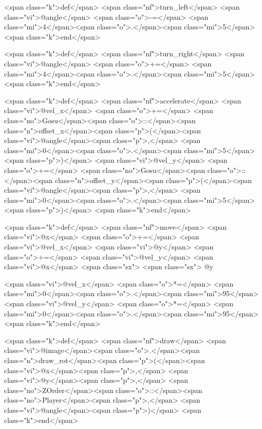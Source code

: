 \begin{rawhtml}
  <span class="k">def</span> <span class="nf">turn_left</span>
    <span class="vi">@angle</span> <span class="o">-=</span> <span class="mi">4</span><span class="o">.</span><span class="mi">5</span>
  <span class="k">end</span>
  
  <span class="k">def</span> <span class="nf">turn_right</span>
    <span class="vi">@angle</span> <span class="o">+=</span> <span class="mi">4</span><span class="o">.</span><span class="mi">5</span>
  <span class="k">end</span>
  
  <span class="k">def</span> <span class="nf">accelerate</span>
    <span class="vi">@vel_x</span> <span class="o">+=</span> <span class="no">Gosu</span><span class="o">::</span><span class="n">offset_x</span><span class="p">(</span><span class="vi">@angle</span><span class="p">,</span> <span class="mi">0</span><span class="o">.</span><span class="mi">5</span><span class="p">)</span>
    <span class="vi">@vel_y</span> <span class="o">+=</span> <span class="no">Gosu</span><span class="o">::</span><span class="n">offset_y</span><span class="p">(</span><span class="vi">@angle</span><span class="p">,</span> <span class="mi">0</span><span class="o">.</span><span class="mi">5</span><span class="p">)</span>
  <span class="k">end</span>
  
  <span class="k">def</span> <span class="nf">move</span>
    <span class="vi">@x</span> <span class="o">+=</span> <span class="vi">@vel_x</span>
    <span class="vi">@y</span> <span class="o">+=</span> <span class="vi">@vel_y</span>
    <span class="vi">@x</span> <span class="sx">%
<span class="sx">    @y %
    
    <span class="vi">@vel_x</span> <span class="o">*=</span> <span class="mi">0</span><span class="o">.</span><span class="mi">95</span>
    <span class="vi">@vel_y</span> <span class="o">*=</span> <span class="mi">0</span><span class="o">.</span><span class="mi">95</span>
  <span class="k">end</span>

  <span class="k">def</span> <span class="nf">draw</span>
    <span class="vi">@image</span><span class="o">.</span><span class="n">draw_rot</span><span class="p">(</span><span class="vi">@x</span><span class="p">,</span> <span class="vi">@y</span><span class="p">,</span> <span class="no">ZOrder</span><span class="o">::</span><span class="no">Player</span><span class="p">,</span> <span class="vi">@angle</span><span class="p">)</span>
  <span class="k">end</span>
  

\end{rawhtml}

